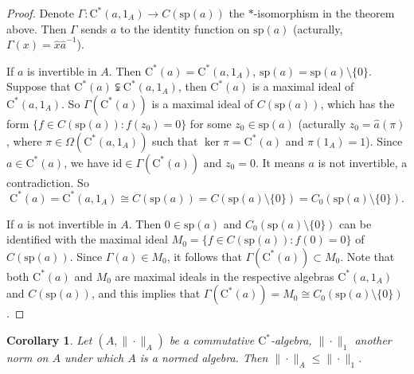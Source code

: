 \documentclass{article}
\newtheorem{corollary}{Corollary}[section]
\begin{document}
\begin{proof}
Denote $\Gamma : \mathrm{C}^* (a,1_A) \to C(\text{sp}(a))$ the $*$-isomorphism in the theorem above. Then $\Gamma$ sends $a$ to the identity function on $\text{sp}(a)$ (acturally, $\Gamma(x) = \hat{x} \hat{a}^{-1}$).

If $a$ is invertible in $A$. Then $\mathrm{C}^* (a) = \mathrm{C}^* (a,1_A)$, $\text{sp}(a) = \text{sp}(a) \setminus \{ 0\}$. Suppose that $\mathrm{C}^* (a) \subsetneqq \mathrm{C}^* (a,1_A)$, then $\mathrm{C}^* (a)$ is a maximal ideal of $\mathrm{C}^* (a,1_A)$.
So $\Gamma (\mathrm{C}^* (a))$ is a maximal ideal of $C(\text{sp}(a))$, which has the form $\{ f \in C(\text{sp}(a)): f (z_0) = 0\}$ for some $z_0 \in \text{sp}(a)$ (acturally $z_0 = \hat{a} (\pi)$, where $\pi \in \Omega(\mathrm{C}^* (a,1_A))$ such that $\ker \pi = \mathrm{C}^* (a)$ and $\pi (1_A)=1$). Since $a \in \mathrm{C}^* (a)$, we have $\text{id} \in \Gamma (\mathrm{C}^* (a))$ and $z_0 = 0$. It means $a$ is not invertible, a contradiction. So
\[
\mathrm{C}^* (a) = \mathrm{C}^* (a,1_A) \cong C(\text{sp}(a)) = C(\text{sp}(a)\setminus \{ 0\}) = C_0 (\text{sp}(a)\setminus \{ 0\}).
\]

If $a$ is not invertible in $A$. Then $0 \in \text{sp}(a)$ and $C_0 (\text{sp}(a) \setminus \{ 0\})$ can be identified with the maximal ideal $M_0 = \{ f \in C(\text{sp}(a)) : f(0)=0\}$ of $C(\text{sp}(a))$. Since $\Gamma (a) \in M_0$, it follows that $\Gamma (\mathrm{C}^*(a)) \subset M_0$. Note that both $\mathrm{C}^*(a)$ and $M_0$ are maximal ideals in the respective algebras $\mathrm{C}^* (a,1_A)$ and $C(\text{sp}(a))$, and this implies that $\Gamma (\mathrm{C}^*(a)) = M_0 \cong C_0 (\text{sp}(a) \setminus \{ 0\})$.

\end{proof}


\begin{corollary}
Let $(A,\| \cdot \|_A)$ be a commutative $\mathrm{C}^*$-algebra, $\| \cdot \|_1$ another norm on $A$ under which $A$ is a normed algebra.
Then $\| \cdot \|_A \leq \| \cdot \|_1$.
\end{corollary}
\end{document}
